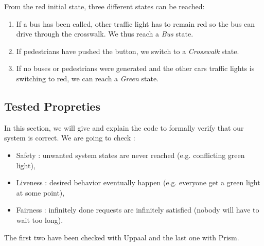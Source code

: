 From the red initial state, three different states can be reached:
\begin{enumerate}
  \item If a bus has been called, other traffic light has to remain red so the bus can drive through the crosswalk. We thus reach a \textit{Bus} state.
  \item If pedestrians have pushed the button, we switch to a \textit{Crosswalk} state.
  \item If no buses or pedestrians were generated and the other cars traffic lights is switching to red, we can reach a \textit{Green} state.
\end{enumerate}

\subsection{Tested Propreties}
In this section, we will give and explain the code to formally verify that our system is correct. We are going to check :
\begin{itemize}
	\item Safety : unwanted system states are never reached (e.g. conflicting green light),
	\item Liveness : desired behavior eventually happen (e.g. everyone get a green light at some point),
	\item Fairness : infinitely done requests are infinitely satisfied (nobody will have to wait too long).
\end{itemize}

The first two have been checked with Uppaal and the last one with Prism.

